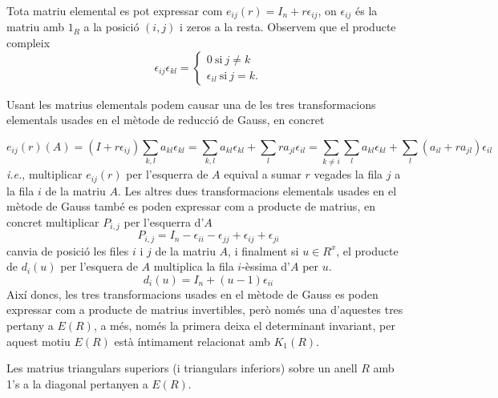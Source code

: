 \begin{obs}
Tota matriu elemental es pot expressar com $e_{ij}(r) = I_n + r\epsilon_{ij}$, on $\epsilon_{ij}$ és la matriu amb $1_R$ a la posició $(i,j)$ i zeros a la resta. Observem que el producte compleix
$$
\epsilon_{ij}\epsilon_{kl} =
\begin{cases}
0 \ \text{si} \ j\neq k \\
\epsilon_{il} \ \text{si} \ j=k.
\end{cases}
$$

Usant les matrius elementals podem causar una de les tres transformacions elementals usades en el mètode de reducció de Gauss, en concret

\begin{equation*}
e_{ij}(r)(A) = (I+r\epsilon_{ij}) \sum_{k,l} a_{kl} \epsilon_{kl} = \sum_{k,l}a_{kl}\epsilon_{kl} + \sum_l ra_{jl}\epsilon_{il}
=
\sum_{k\neq i} \sum_{l}a_{kl}\epsilon_{kl} + \sum_{l}(a_{il}+ra_{jl})\epsilon_{il}
\end{equation*}
\textit{i.e.}, multiplicar $e_{ij}(r)$ per l'esquerra de $A$ equival a sumar $r$ vegades la fila $j$ a la fila $i$ de la matriu $A$.  Les altres dues transformacions elementals usades en el mètode de Gauss també es poden expressar com a producte de matrius, en concret multiplicar $P_{i,j}$ per l'esquerra d'$A$ 
$$
P_{i,j}=I_n - \epsilon_{ii} - \epsilon_{jj} + \epsilon_{ij} + \epsilon_{ji}
$$
canvia de posició les files $i$ i $j$ de la matriu $A$, i finalment si $u\in R^{x}$, el producte de $d_i(u)$ per l'esquera de $A$ multiplica la fila $i$-èssima d'$A$ per $u$.
$$
d_i(u)=I_n+(u-1)\epsilon_{ii}
$$
Així doncs, les tres transformacions usades en el mètode de Gauss es poden expressar com a producte de matrius invertibles, però només una d'aquestes tres pertany a $E(R)$, a més, només la primera deixa el determinant invariant, per aquest motiu $E(R)$ està íntimament relacionat amb $K_1(R)$. 
\end{obs}

\begin{lemma} \label{triangular}
Les matrius triangulars superiors (i triangulars inferiors) sobre un anell $R$ amb 1's a la diagonal pertanyen a $E(R)$.
\end{lemma}

